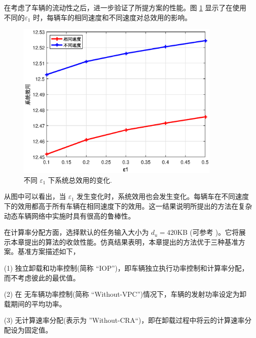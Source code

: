 在考虑了车辆的流动性之后，进一步验证了所提方案的性能。图 \ref{F6} 显示了在使用不同的$\varepsilon_1$ 时，每辆车的相同速度和不同速度对总效用的影响。
\begin{figure}[H]
\centering
\includegraphics[width=10cm]{figures//chap3//diff_e1.eps}
\caption{不同 $\varepsilon_1$ 下系统总效用的变化.}
\label{F6}
\end{figure}

从图中可以看出，当 $\varepsilon_1$ 发生变化时，系统效用也会发生变化。每辆车在不同速度下的效用都高于所有车辆在相同速度下的效用。这一结果说明所提出的方法在复杂动态车辆网络中实施时具有很高的鲁棒性。

在计算率分配方面，选择默认的任务输入大小为 $d_u=420$KB (可参考 \cite{Xu2015})。它将展示本章提出的算法的收敛性能。仿真结果表明，本章提出的方法优于三种基准方案。基准方案描述如下，

(1) 独立卸载和功率控制(简称 “IOP”)，即车辆独立执行功率控制和计算率分配，而不考虑彼此的最优值。

(2) 在  无车辆功率控制(简称 “Without-VPC”)情况下，车辆的发射功率设定为卸载期间的平均功率。

(3) 无计算速率分配(表示为 ”Without-CRA“)，即在卸载过程中将云的计算速率分配设为固定值。

